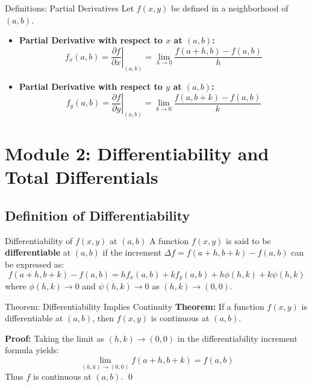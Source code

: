 \documentclass[11pt,a4paper]{article}
\begin{document}
\begin{defbox}{Definitions: Partial Derivatives}
Let $f(x,y)$ be defined in a neighborhood of $(a,b)$.
\begin{itemize}
    \item \textbf{Partial Derivative with respect to $x$ at $(a,b)$:}
    \begin{equation}
        f_x(a,b) = \left. \frac{\partial f}{\partial x} \right|_{(a,b)} = \lim_{h \to 0} \frac{f(a+h, b) - f(a,b)}{h}
    \end{equation}
    
    \item \textbf{Partial Derivative with respect to $y$ at $(a,b)$:}
    \begin{equation}
        f_y(a,b) = \left. \frac{\partial f}{\partial y} \right|_{(a,b)} = \lim_{k \to 0} \frac{f(a, b+k) - f(a,b)}{k}
    \end{equation}
\end{itemize}
\end{defbox}

\section{Module 2: Differentiability and Total Differentials}

\subsection{Definition of Differentiability}

\begin{formulabox}{Differentiability of $f(x,y)$ at $(a,b)$}
A function $f(x,y)$ is said to be \textbf{differentiable} at $(a,b)$ if the increment $\Delta f = f(a+h, b+k) - f(a,b)$ can be expressed as:
\begin{equation}
    f(a+h, b+k) - f(a,b) = h f_x(a,b) + k f_y(a,b) + h \phi(h,k) + k \psi(h,k)
\end{equation}
where $\phi(h,k) \to 0$ and $\psi(h,k) \to 0$ as $(h,k) \to (0,0)$.
\end{formulabox}

\begin{exbox}{Theorem: Differentiability Implies Continuity}
\textbf{Theorem:} If a function $f(x,y)$ is differentiable at $(a,b)$, then $f(x,y)$ is continuous at $(a,b)$.

\textbf{Proof:} Taking the limit as $(h,k) \to (0,0)$ in the differentiability increment formula yields:
$$\lim_{(h,k) \to (0,0)} f(a+h, b+k) = f(a,b)$$
Thus $f$ is continuous at $(a,b)$. \qed
\end{exbox}
\end{document}
